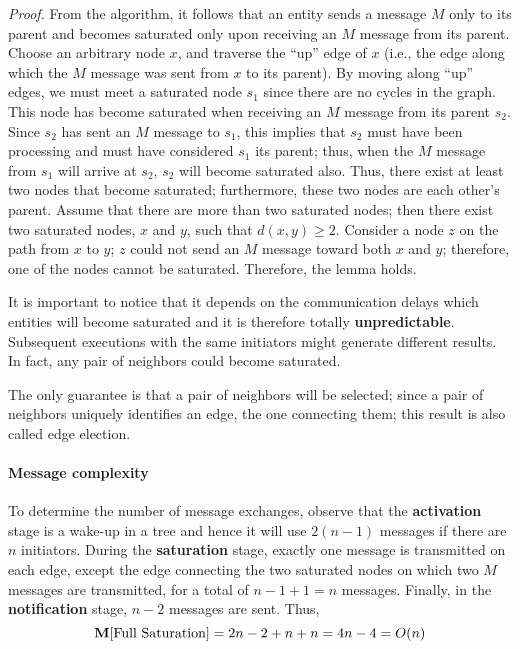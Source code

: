 



\textit{Proof.} From the algorithm, it follows that an entity sends a message $M$ only to its parent and becomes saturated only upon receiving an $M$ message from its parent. Choose an arbitrary node $x$, and traverse the “up” edge of $x$ (i.e., the edge along which the $M$ message was sent from $x$ to its parent). By moving along “up” edges, we must meet a saturated node $s_1$ since there are no cycles in the graph. This node has become saturated when receiving an $M$ message from its parent $s_2$. Since $s_2$ has sent an $M$ message to $s_1$, this implies that $s_2$ must have been processing and must have considered $s_1$ its parent; thus, when the $M$ message from $s_1$ will arrive at $s_2$, $s_2$ will become saturated also. Thus, there exist at least two nodes that become saturated; furthermore, these two nodes are each other’s parent. Assume that there are more than two saturated nodes; then there exist two saturated nodes, $x$ and $y$, such that $d(x, y) \geq 2$. Consider a node $z$ on the path from $x$ to $y$; $z$ could not send an $M$ message toward both $x$ and $y$; therefore, one of the nodes cannot be saturated. Therefore, the lemma holds.

It is important to notice that it depends on the communication delays which entities will become saturated and it is therefore totally \textbf{unpredictable}. Subsequent executions with the same initiators might generate different results. In fact, any pair of neighbors could become saturated.

The only guarantee is that a pair of neighbors will be selected; since a pair of neighbors uniquely identifies an edge, the one connecting them; this result is also called edge election. 

\paragraph{Message complexity}
To determine the number of message exchanges, observe that the \textbf{activation} stage is a wake-up in a tree and hence it will use $2(n-1)$ messages if there are $n$ initiators. During the \textbf{saturation} stage, exactly one message is transmitted on each edge, except the edge connecting the two saturated nodes on which two $M$ messages are transmitted, for a total of $n - 1 + 1 = n$ messages. Finally, in the \textbf{notification} stage, $n-2$ messages are sent. Thus,
$$\mathbf{M}[\text{Full Saturation}] = 2n - 2 + n + n = 4n - 4 = O(n)$$


